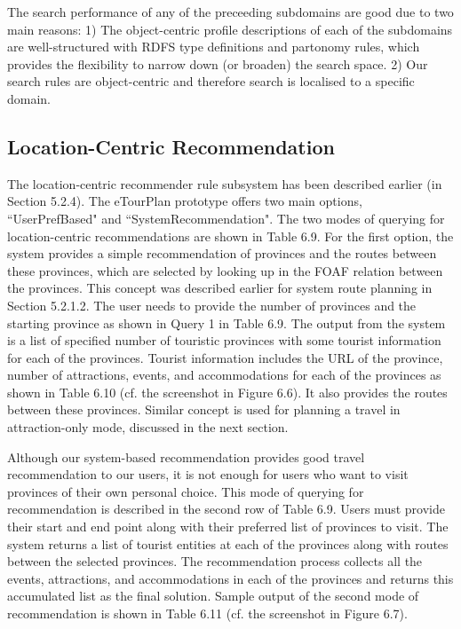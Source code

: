 \hspace{0.3in}The search performance of any of the preceeding subdomains are good due to two main reasons: 1) The object-centric profile descriptions of each of the subdomains are well-structured with RDFS type definitions and partonomy rules, which provides the flexibility to narrow down (or broaden) the search space. 2) Our search rules are object-centric and therefore search is localised to a specific domain.  

\subsection{Location-Centric Recommendation}

\hspace{0.3in}The location-centric recommender rule subsystem  has been described earlier (in Section 5.2.4). The eTourPlan prototype offers two main options, ``UserPrefBased" and ``SystemRecommendation". The two modes of querying for location-centric recommendations are shown in Table 6.9. For the first option, the system provides a simple recommendation of provinces and the routes between these provinces, which are selected by looking up in the FOAF relation between the provinces. This concept was described earlier for system route planning in Section 5.2.1.2. The user needs to provide the number of provinces and the starting province as shown in Query 1 in Table 6.9. The output from the system is a list of specified number of touristic provinces with some tourist information for each of the provinces. Tourist information includes the URL of the province, number of attractions, events, and accommodations for each of the provinces as shown in Table 6.10 (cf. the screenshot in Figure 6.6). It also provides the routes between these provinces. Similar concept is used for planning a travel in attraction-only mode, discussed in the next section.

\hspace{0.3in} Although our system-based recommendation provides good travel recommendation to our users, it is not enough for users who want to visit provinces of their own personal choice. This mode of querying for recommendation is described in the second row of Table 6.9. Users must provide their start and end point along with their preferred list of provinces to visit.  The system returns a list of tourist entities at each of the provinces along with routes between the selected provinces. The recommendation process collects all the events, attractions, and accommodations in each of the provinces and returns this accumulated list as the final solution. Sample output of the second mode of recommendation is shown in Table 6.11 (cf. the screenshot in Figure 6.7).

